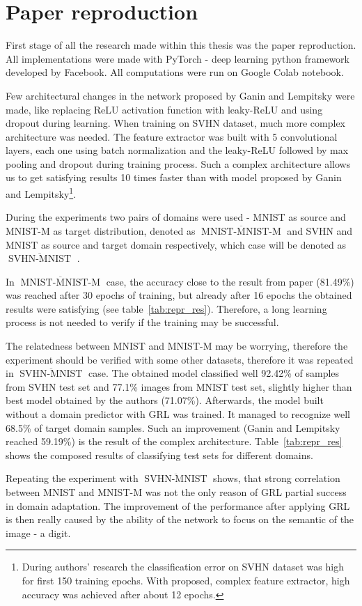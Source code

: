 \documentclass[shortabstract, inz, english]{iithesis}
\DeclareMathOperator{\mnistM}{MNIST-MNIST-M}
\DeclareMathOperator{\svhnM}{SVHN-MNIST}
\newcommand{\mnist}{$\overline{\mnistM}$ }
\newcommand{\svhn}{$\overline{\svhnM}$ }
\begin{document}
\section{Paper reproduction}
First stage of all the research made within this thesis was the paper reproduction. All implementations were made with PyTorch \cite{pytorch} - deep learning python framework developed by Facebook. All computations were run on Google Colab \cite{colab} notebook. 
\par
Few architectural changes in the network proposed by Ganin and Lempitsky were made, like replacing ReLU activation function with leaky-ReLU \cite{leaky_relu} and using dropout \cite{dropout} during learning. When training on SVHN dataset, much more complex architecture was needed. The feature extractor was built with 5 convolutional layers, each one using batch normalization \cite{batch_norm} and the leaky-ReLU followed by max pooling and dropout during training process. Such a complex architecture allows us to get satisfying results 10 times faster than with model proposed by Ganin and Lempitsky\footnote{During authors' research the classification error on SVHN dataset was high for first 150 training epochs. With proposed, complex feature extractor, high accuracy was achieved after about 12 epochs.}.
\par
During the experiments two pairs of domains were used - MNIST as source and MNIST-M as target distribution, denoted as \mnist and SVHN and MNIST as source and target domain respectively, which case will be denoted as \svhn.  
\par
In \mnist case, the accuracy close to the result from paper (81.49\%) was reached after 30 epochs of training, but already after 16 epochs the obtained results were satisfying (see table~\ref{tab:repr_res}). Therefore, a long learning process is not needed to verify if the training may be successful.
\par
The relatedness between MNIST and MNIST-M may be worrying, therefore the experiment should be verified with some other datasets, therefore it was repeated in \svhn case. The obtained model classified well 92.42\% of samples from SVHN test set and 77.1\% images from MNIST test set, slightly higher than best model obtained by the authors (71.07\%). Afterwards, the model built without a domain predictor with GRL was trained. It managed to recognize well 68.5\% of target domain samples. Such an improvement (Ganin and Lempitsky reached 59.19\%) is the result of the complex architecture. Table~\ref{tab:repr_res} shows the composed results of classifying test sets for different domains.
\par
Repeating the experiment with \svhn shows, that strong correlation between MNIST and MNIST-M was not the only reason of GRL partial success in domain adaptation. The improvement of the performance after applying GRL is then really caused by the ability of the network to focus on the semantic of the image - a digit.
\end{document}
